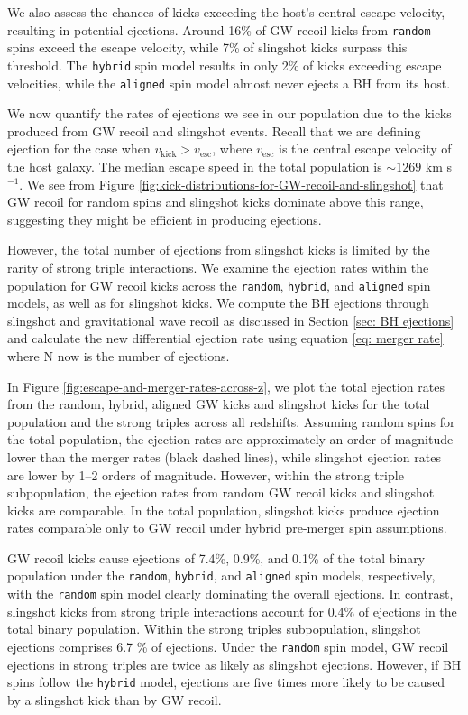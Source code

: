 \documentclass[twocolumn,linenumbers]{aastex701}
\newcommand{\kms}{km s$^{-1}$}
\begin{document}
We also assess the chances of kicks exceeding the host's central escape velocity, resulting in potential ejections. Around 16\% of GW recoil kicks from \texttt{random} spins exceed
the escape velocity, while 7\% of slingshot kicks surpass this threshold. 
The \texttt{hybrid} spin model results in only 2\% of kicks exceeding escape velocities, while the \texttt{aligned} spin model almost never ejects a BH from its host. 

We now quantify the rates of ejections we see in our population due to the kicks produced from GW recoil and slingshot events. Recall that we are defining ejection for the case when $v_{\text{kick}} > v_{\text{esc}}$, where $v_{\text{esc}}$ is the central escape velocity of the host galaxy. The median escape speed in the total population is $\sim 1269$ \kms. We see from Figure \ref{fig:kick-distributions-for-GW-recoil-and-slingshot} that GW recoil for random spins and slingshot kicks dominate above this range, suggesting they might be efficient in producing ejections. 

However, the total number of ejections from slingshot kicks is limited by the rarity of strong triple interactions. We examine the ejection rates within the population for GW recoil kicks across the \texttt{random}, \texttt{hybrid}, and \texttt{aligned} spin models, as well as for slingshot kicks. We compute the BH ejections through slingshot and gravitational wave recoil as discussed in Section \ref{sec: BH ejections} and calculate the new differential ejection rate using equation \ref{eq: merger rate} where N now is the number of ejections. 

In Figure \ref{fig:escape-and-merger-rates-across-z}, we plot the total ejection rates  from the random, hybrid, aligned GW kicks and slingshot kicks for the total population and the strong triples across all redshifts. Assuming random spins for the total population, the ejection rates 
are approximately an order of magnitude lower than the merger rates (black dashed lines), while slingshot ejection rates are lower by 1–2 orders of magnitude. However, within the strong triple subpopulation, the ejection rates from random GW recoil kicks and slingshot kicks are comparable. In the total population, slingshot kicks produce ejection rates comparable only to GW recoil under hybrid pre-merger spin assumptions.

GW recoil kicks cause ejections of 7.4\%, 0.9\%, and 0.1\% of the total binary population under the \texttt{random}, \texttt{hybrid}, and \texttt{aligned} spin models, respectively, with the \texttt{random} spin model clearly dominating the overall ejections. In contrast, slingshot kicks from strong triple interactions account for 0.4\% of ejections in the total binary population. Within the strong triples subpopulation, slingshot ejections comprises 6.7 \% of ejections. Under the \texttt{random} spin model, GW recoil ejections in strong triples are twice as likely as slingshot ejections. However, if BH spins follow the \texttt{hybrid} model, ejections are five times more likely to be caused by a slingshot kick than by GW recoil.
\end{document}
